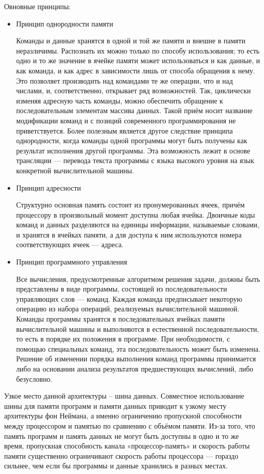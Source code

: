 \documentclass{article}
\begin{document}
Овновные принципы:
\begin{itemize}
    \item Принцип однородности памяти
    
    Команды и данные хранятся в одной и той же памяти и внешне в памяти неразличимы. Распознать их можно только по способу использования; то есть одно и то же значение в ячейке памяти может использоваться и как данные, и как команда, и как адрес в зависимости лишь от способа обращения к нему. Это позволяет производить над командами те же операции, что и над числами, и, соответственно, открывает ряд возможностей. Так, циклически изменяя адресную часть команды, можно обеспечить обращение к последовательным элементам массива данных. Такой приём носит название модификации команд и с позиций современного программирования не приветствуется. Более полезным является другое следствие принципа однородности, когда команды одной программы могут быть получены как результат исполнения другой программы. Эта возможность лежит в основе трансляции — перевода текста программы с языка высокого уровня на язык конкретной вычислительной машины.
    
    \item Принцип адресности
    
    Структурно основная память состоит из пронумерованных ячеек, причём процессору в произвольный момент доступна любая ячейка. Двоичные коды команд и данных разделяются на единицы информации, называемые словами, и хранятся в ячейках памяти, а для доступа к ним используются номера соответствующих ячеек — адреса.
    
    \item Принцип программного управления
    
    Все вычисления, предусмотренные алгоритмом решения задачи, должны быть представлены в виде программы, состоящей из последовательности управляющих слов — команд. Каждая команда предписывает некоторую операцию из набора операций, реализуемых вычислительной машиной. Команды программы хранятся в последовательных ячейках памяти вычислительной машины и выполняются в естественной последовательности, то есть в порядке их положения в программе. При необходимости, с помощью специальных команд, эта последовательность может быть изменена. Решение об изменении порядка выполнения команд программы принимается либо на основании анализа результатов предшествующих вычислений, либо безусловно.
\end{itemize}

Узкое место данной архитектуры -- шина данных. Совместное использование шины для памяти программ и памяти данных приводит к узкому месту архитектуры фон Неймана, а именно ограничению пропускной способности между процессором и памятью по сравнению с объёмом памяти. Из-за того, что память программ и память данных не могут быть доступны в одно и то же время, пропускная способность канала «процессор-память» и скорость работы памяти существенно ограничивают скорость работы процессора — гораздо сильнее, чем если бы программы и данные хранились в разных местах.
\end{document}
